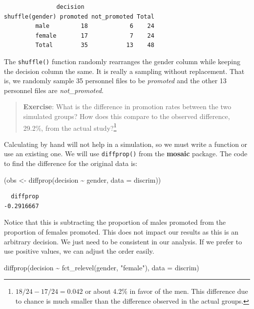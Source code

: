 \documentclass[
  letterpaper,
  DIV=11,
  numbers=noendperiod]{scrreprt}
\newenvironment{Shaded}{\begin{snugshade}}{\end{snugshade}}
\newcommand{\AttributeTok}[1]{\textcolor[rgb]{0.40,0.45,0.13}{#1}}
\newcommand{\FunctionTok}[1]{\textcolor[rgb]{0.28,0.35,0.67}{#1}}
\newcommand{\NormalTok}[1]{\textcolor[rgb]{0.00,0.23,0.31}{#1}}
\newcommand{\OtherTok}[1]{\textcolor[rgb]{0.00,0.23,0.31}{#1}}
\newcommand{\SpecialCharTok}[1]{\textcolor[rgb]{0.37,0.37,0.37}{#1}}
\newcommand{\StringTok}[1]{\textcolor[rgb]{0.13,0.47,0.30}{#1}}
\begin{document}
\begin{verbatim}
               decision
shuffle(gender) promoted not_promoted Total
         male         18            6    24
         female       17            7    24
         Total        35           13    48
\end{verbatim}

The \texttt{shuffle()} function randomly rearranges the gender column
while keeping the decision column the same. It is really a sampling
without replacement. That is, we randomly sample 35 personnel files to
be \emph{promoted} and the other 13 personnel files are
\emph{not\_promoted}.

\begin{quote}
\textbf{Exercise}: What is the difference in promotion rates between the
two simulated groups? How does this compare to the observed difference,
29.2\%, from the actual study?\footnote{\(18/24 - 17/24 = 0.042\) or
  about 4.2\% in favor of the men. This difference due to chance is much
  smaller than the difference observed in the actual groups.}
\end{quote}

Calculating by hand will not help in a simulation, so we must write a
function or use an existing one. We will use \texttt{diffprop()} from
the \textbf{mosaic} package. The code to find the difference for the
original data is:

\begin{Shaded}
\begin{Highlighting}[]
\NormalTok{(obs }\OtherTok{\textless{}{-}} \FunctionTok{diffprop}\NormalTok{(decision }\SpecialCharTok{\textasciitilde{}}\NormalTok{ gender, }\AttributeTok{data =}\NormalTok{ discrim))}
\end{Highlighting}
\end{Shaded}

\begin{verbatim}
  diffprop 
-0.2916667 
\end{verbatim}

Notice that this is subtracting the proportion of males promoted from
the proportion of females promoted. This does not impact our results as
this is an arbitrary decision. We just need to be consistent in our
analysis. If we prefer to use positive values, we can adjust the order
easily.

\begin{Shaded}
\begin{Highlighting}[]
\FunctionTok{diffprop}\NormalTok{(decision }\SpecialCharTok{\textasciitilde{}} \FunctionTok{fct\_relevel}\NormalTok{(gender, }\StringTok{"female"}\NormalTok{), }\AttributeTok{data =}\NormalTok{ discrim)}
\end{Highlighting}
\end{Shaded}
\end{document}
